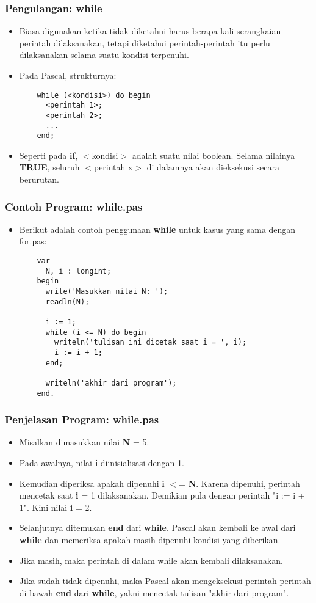 \begin{frame}[fragile]
\frametitle{Pengulangan: while}
\begin{itemize}
  \item Biasa digunakan ketika tidak diketahui harus berapa kali serangkaian perintah dilaksanakan, tetapi diketahui perintah-perintah itu perlu dilaksanakan selama suatu kondisi terpenuhi.
  \item Pada Pascal, strukturnya:
  \begin{lstlisting}
    while (<kondisi>) do begin
      <perintah 1>;
      <perintah 2>;
      ...
    end;
  \end{lstlisting}
  \item Seperti pada \textbf{if}, $<$kondisi$>$ adalah suatu nilai boolean. Selama nilainya \textbf{TRUE}, seluruh $<$perintah x$>$ di dalamnya akan dieksekusi secara berurutan.
\end{itemize}
\end{frame}

\begin{frame}[fragile]
\frametitle{Contoh Program: while.pas}
\begin{itemize}
  \item Berikut adalah contoh penggunaan \textbf{while} untuk kasus yang sama dengan for.pas:
  \begin{lstlisting}
    var
      N, i : longint;
    begin
      write('Masukkan nilai N: ');
      readln(N);

      i := 1;
      while (i <= N) do begin
        writeln('tulisan ini dicetak saat i = ', i);
        i := i + 1;
      end;

      writeln('akhir dari program');
    end.
  \end{lstlisting}
\end{itemize}
\end{frame}

\begin{frame}
\frametitle{Penjelasan Program: while.pas}
\begin{itemize}
  \item Misalkan dimasukkan nilai \textbf{N} = 5.
  \item Pada awalnya, nilai \textbf{i} diinisialisasi dengan 1.
  \item Kemudian diperiksa apakah dipenuhi \textbf{i} $<$= \textbf{N}. Karena dipenuhi, perintah mencetak saat \textbf{i} = 1 dilaksanakan. Demikian pula dengan perintah "i := i + 1". Kini nilai \textbf{i} = 2.
  \item Selanjutnya ditemukan \textbf{end} dari \textbf{while}. Pascal akan kembali ke awal dari \textbf{while} dan memeriksa apakah masih dipenuhi kondisi yang diberikan.
  \item Jika masih, maka perintah di dalam while akan kembali dilaksanakan.
  \item Jika sudah tidak dipenuhi, maka Pascal akan mengeksekusi perintah-perintah di bawah \textbf{end} dari \textbf{while}, yakni mencetak tulisan "akhir dari program".
\end{itemize}
\end{frame}

